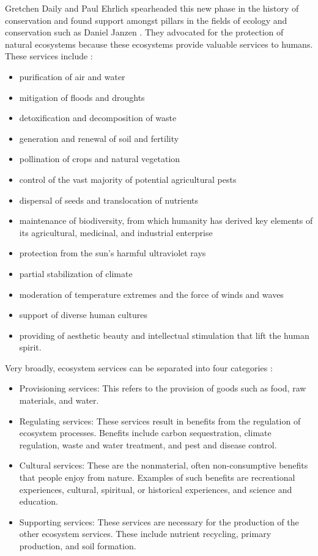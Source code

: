 \documentclass[rutwik_proposal.tex]{subfiles}
\begin{document}
Gretchen Daily and Paul Ehrlich spearheaded this new phase in the history of conservation and found support amongst pillars in the fields of ecology and conservation such as Daniel Janzen \cite{Daily97, Alexander97, Janzen00, Janzen98, Janzen2000}. They advocated for the protection of natural ecosystems because these ecosystems provide valuable services to humans. These services include \cite{Daily97}:
\begin{itemize}
\item purification of air and water
\item mitigation of floods and droughts
\item detoxification and decomposition of waste
\item generation and renewal of soil and fertility
\item pollination of crops and natural vegetation
\item control of the vast majority of potential agricultural pests
\item dispersal of seeds and translocation of nutrients
\item maintenance of biodiversity, from which humanity has derived key elements of its agricultural, medicinal, and industrial enterprise
\item protection from the sun's harmful ultraviolet rays
\item partial stabilization of climate
\item moderation of temperature extremes and the force of winds and waves
\item support of diverse human cultures
\item providing of aesthetic beauty and intellectual stimulation that lift the human spirit.
\end{itemize}
Very broadly, ecosystem services can be separated into four categories \cite{MEA05}:
\begin{itemize}
\item Provisioning services: This refers to the provision of goods such as food, raw materials, and water.
\item Regulating services: These services result in benefits from the regulation of ecosystem processes. Benefits include carbon sequestration, climate regulation, waste and water treatment, and pest and disease control.
\item Cultural services: These are the nonmaterial, often non-consumptive benefits that people enjoy from nature. Examples of such benefits are recreational experiences, cultural, spiritual, or historical experiences, and science and education.
\item Supporting services: These services are necessary for the production of the other ecosystem services. These include nutrient recycling, primary production, and soil formation.
\end{itemize}
\end{document}
